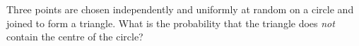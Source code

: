 Three points are chosen independently and uniformly at random on a circle and joined to form a triangle. What is the probability that the triangle does \emph{not} contain the centre of the circle?
